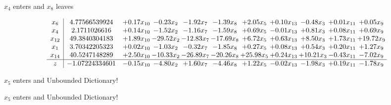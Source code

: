 \documentclass[9pt]{article}
\begin{document}
 $ x_{4} $ enters and $ x_{8} $ leaves 

 \[\begin{array}{c| c c@{\hskip 2pt} c@{\hskip 2pt} c@{\hskip 2pt} c@{\hskip 2pt} c@{\hskip 2pt} c@{\hskip 2pt} c@{\hskip 2pt} c@{\hskip 2pt} c@{\hskip 2pt} }
 x_{6}   &  4.77566539924 & +  0.17 x_{10} & -0.23 x_{2} & -1.92 x_{7} & -1.39 x_{8} & +  2.05 x_{5} & +  0.10 x_{13} & -0.48 x_{3} & +  0.01 x_{11} & +  0.05 x_{9}\\
 x_{4}   &  2.1711026616 & +  0.14 x_{10} & -1.52 x_{2} & -1.16 x_{7} & -1.59 x_{8} & +  0.69 x_{5} & -0.01 x_{13} & +  0.81 x_{3} & +  0.08 x_{11} & +  0.69 x_{9}\\
 x_{12}   &  49.3840304183 & +  1.89 x_{10} & -29.52 x_{2} & -12.83 x_{7} & -17.69 x_{8} & +  6.72 x_{5} & +  0.63 x_{13} & +  8.50 x_{3} & +  1.73 x_{11} & + 19.72 x_{9}\\
 x_{1}   &  3.70342205323 & +  0.02 x_{10} & -1.03 x_{2} & -0.32 x_{7} & -1.85 x_{8} & +  0.27 x_{5} & +  0.08 x_{13} & +  0.54 x_{3} & +  0.20 x_{11} & +  1.27 x_{9}\\
 x_{14}   &  40.5247148289 & +  2.50 x_{10} & -10.33 x_{2} & -26.89 x_{7} & -20.26 x_{8} & + 25.98 x_{5} & +  0.24 x_{13} & + 10.21 x_{3} & -0.43 x_{11} & -7.02 x_{9}\\
\hline
z    &  -1.07224334601 & -0.15 x_{10} & -4.80 x_{2} & +  1.60 x_{7} & -4.46 x_{8} & +  1.22 x_{5} & -0.02 x_{13} & -1.98 x_{3} & +  0.19 x_{11} & -1.78 x_{9}\\
\end{array}\]


 $ x_{5} $ enters and Unbounded Dictionary!


 $ x_{5} $ enters and Unbounded Dictionary!
\end{document}
